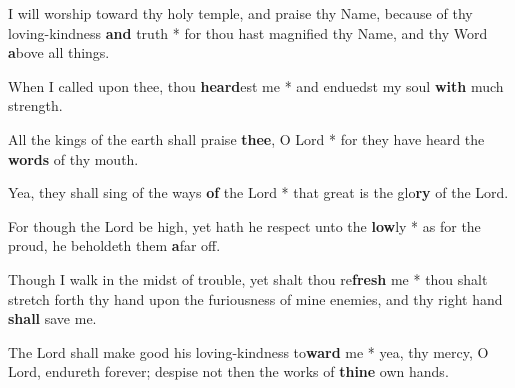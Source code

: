\begin{multicols}{2}
	I will worship toward thy holy temple, and praise thy Name, because of thy loving-kindness \textbf{and} truth * for thou hast magnified thy Name, and thy Word \textbf{a}bove all things.
	
	When I called upon thee, thou \textbf{heard}est me * and enduedst my soul \textbf{with} much strength.
	
	All the kings of the earth shall praise \textbf{thee}, O Lord * for they have heard the \textbf{words} of thy mouth.
	
	Yea, they shall sing of the ways \textbf{of} the Lord * that great is the glo\textbf{ry} of the Lord.
	
	For though the Lord be high, yet hath he respect unto the \textbf{low}ly * as for the proud, he beholdeth them \textbf{a}far off.
	
	Though I walk in the midst of trouble, yet shalt thou re\textbf{fresh} me * thou shalt stretch forth thy hand upon the furiousness of mine enemies, and thy right hand \textbf{shall} save me.
	
	The Lord shall make good his loving-kindness to\textbf{ward} me * yea, thy mercy, O Lord, endureth forever; despise not then the works of \textbf{thine} own hands.
\end{multicols}